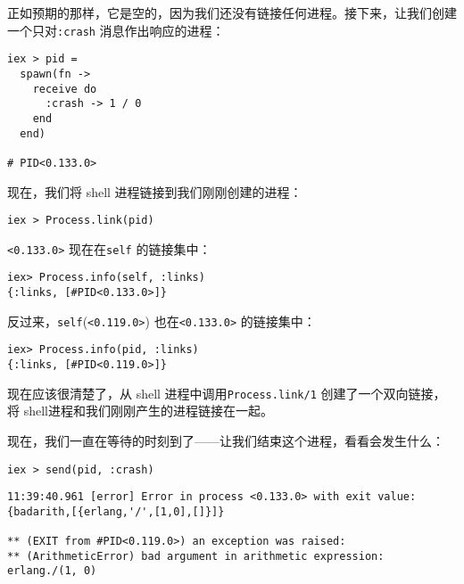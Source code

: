 正如预期的那样，它是空的，因为我们还没有链接任何进程。接下来，让我们创建一个只对\texttt{:crash} 消息作出响应的进程：

\begin{code}{}
\begin{verbatim}
iex > pid =
  spawn(fn ->
    receive do
      :crash -> 1 / 0
    end
  end)

# PID<0.133.0>
\end{verbatim}
\end{code}

现在，我们将 shell 进程链接到我们刚刚创建的进程：

\begin{code}{}
\begin{verbatim}
iex > Process.link(pid)
\end{verbatim}
\end{code}

\texttt{<0.133.0>} 现在在\texttt{self} 的链接集中：

\begin{code}{}
\begin{verbatim}
iex> Process.info(self, :links)
{:links, [#PID<0.133.0>]}
\end{verbatim}
\end{code}

反过来，\texttt{self}(\texttt{<0.119.0>}) 也在\texttt{<0.133.0>} 的链接集中：

\begin{code}{}
\begin{verbatim}
iex> Process.info(pid, :links)
{:links, [#PID<0.119.0>]}
\end{verbatim}
\end{code}

现在应该很清楚了，从 shell 进程中调用\texttt{Process.link/1} 创建了一个双向链接，将 shell进程和我们刚刚产生的进程链接在一起。

现在，我们一直在等待的时刻到了------让我们结束这个进程，看看会发生什么：

\begin{code}{}
\begin{verbatim}
iex > send(pid, :crash)
\end{verbatim}
\end{code}

\begin{code}{}
\begin{verbatim}
11:39:40.961 [error] Error in process <0.133.0> with exit value: {badarith,[{erlang,'/',[1,0],[]}]}
 
** (EXIT from #PID<0.119.0>) an exception was raised:
** (ArithmeticError) bad argument in arithmetic expression: erlang./(1, 0)
\end{verbatim}
\end{code}

